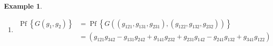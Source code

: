 \documentclass[aps,preprint]{revtex4}%
\newtheorem{example}[theorem]{Example}
\begin{document}
\begin{example}
\begin{enumerate}
\begin{align}
&  =\,+g_{121}\left\vert e_{1}\wedge e_{2}\right\rangle \wedge\left(
g_{342}\left\vert e_{3}\wedge e_{4}\right\rangle \right)  +g_{131}\left\vert
e_{1}\wedge e_{3}\right\rangle \wedge\left(  g_{242}\left\vert e_{2}\wedge
e_{4}\right\rangle \right) \\
&  +g_{141}\left\vert e_{1}\wedge e_{4}\right\rangle \wedge\left(
g_{231}\left\vert e_{2}\wedge e_{3}\right\rangle \right)  +g_{231}\left\vert
e_{2}\wedge e_{3}\right\rangle \wedge\left(  g_{141}\left\vert e_{1}\wedge
e_{4}\right\rangle \right) \\
&  +g_{241}\left\vert e_{2}\wedge e_{4}\right\rangle \wedge\left(
g_{131}\left\vert e_{1}\wedge e_{3}\right\rangle \right)  +g_{341}\left\vert
e_{3}\wedge e_{4}\right\rangle \wedge\left(  g_{121}\left\vert e_{1}\wedge
e_{2}\right\rangle \right)  ,
\end{align}
factoring out the $\left\vert e_{1}\wedge e_{2}\wedge e_{3}\wedge
e_{4}\right\rangle $ term gives
\begin{align}
&  g_{1}\wedge g_{2}=\left(  \,g_{121}\left\vert e_{1}\wedge e_{2}%
\right\rangle \wedge g_{342}\left\vert e_{3}\wedge e_{4}\right\rangle
+g_{131}\left\vert e_{1}\wedge e_{3}\right\rangle \wedge g_{342}\left\vert
e_{3}\wedge e_{4}\right\rangle +g_{141}\left\vert e_{1}\wedge e_{4}%
\right\rangle \wedge g_{232}\left\vert e_{2}\wedge e_{3}\right\rangle \right.
\\
&  +\left.  g_{231}\left\vert e_{2}\wedge e_{3}\right\rangle \wedge
g_{142}\left\vert e_{1}\wedge e_{4}\right\rangle +g_{241}\left\vert
e_{2}\wedge e_{4}\right\rangle \wedge g_{132}\left\vert e_{1}\wedge
e_{3}\right\rangle +g_{341}\left\vert e_{3}\wedge e_{4}\right\rangle \wedge
g_{122}\left\vert e_{1}\wedge e_{2}\right\rangle \right) \\
&  =\left\vert e_{1}\wedge e_{2}\wedge e_{3}\wedge e_{4}\right\rangle \left(
g_{121}g_{342}-g_{131}g_{242}+g_{141}g_{232}+g_{231}g_{142}-g_{241}%
g_{132}+g_{341}g_{122}\right) \\
&  =\left\vert e_{1}\wedge e_{2}\wedge e_{3}\wedge e_{4}\right\rangle
\operatorname{Pf}\left\{  G\left(  g_{1},g_{2}\right)  \right\} \\
&  =\left\vert e_{1}\wedge e_{2}\wedge e_{3}\wedge e_{4}\right\rangle
\operatorname{Pf}\left\{  G\left(  \left(  g_{121},g_{131},g_{231}\right)
,\left(  g_{122},g_{132},g_{232}\right)  \right)  \right\}  .
\end{align}


\item
\begin{align}
\operatorname{Pf}\left\{  G\left(  g_{1},g_{2}\right)  \right\}   &
=\operatorname{Pf}\left\{  G\left(  \left(  g_{121},g_{131},g_{231}\right)
,\left(  g_{122},g_{132},g_{232}\right)  \right)  \right\} \\
&  =\left(  g_{121}g_{342}-g_{131}g_{242}+g_{141}g_{232}+g_{231}%
g_{142}-g_{241}g_{132}+g_{341}g_{122}\right)
\end{align}

\end{enumerate}
\end{example}
\end{document}
